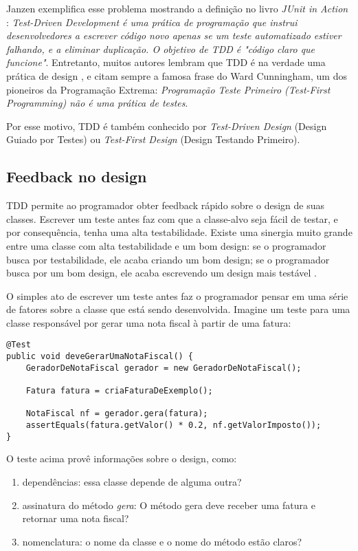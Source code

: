 Janzen \cite{tdd-taxonomy} exemplifica esse problema mostrando a definição no livro \textit{JUnit in Action} \cite{junit-in-action}:
\textit{Test-Driven Development é uma prática de programação que instrui desenvolvedores a escrever código novo apenas se um teste
automatizado estiver falhando, e a eliminar duplicação. O objetivo de TDD é "código claro que funcione"}. 
Entretanto, muitos autores lembram que TDD é na verdade uma prática de design \cite{tdd-taxonomy} \cite{aim-fire}, 
e citam sempre a famosa frase do Ward Cunningham, um dos pioneiros da Programação Extrema:
\textit{Programação Teste Primeiro (Test-First Programming) não é uma prática de testes}. 

Por esse motivo, TDD é também conhecido por \textit{Test-Driven Design} (Design Guiado por Testes) ou \textit{Test-First Design}
(Design Testando Primeiro).

\subsection{Feedback no design}

TDD permite ao programador obter feedback rápido sobre o design de suas classes. Escrever um teste antes faz com que
a classe-alvo seja fácil de testar, e por consequência, tenha uma alta testabilidade. Existe uma sinergia muito
grande entre uma classe com alta testabilidade e um bom design: se o programador busca por testabilidade,
ele acaba criando um bom design; se o programador busca por um bom design, ele acaba escrevendo um design mais testável \cite{feathers-synergy}.  

O simples ato de escrever um teste antes faz o programador pensar em uma série de fatores 
sobre a classe que está sendo desenvolvida. Imagine um teste para uma 
classe responsável por gerar uma nota fiscal à partir de uma fatura:

\begin{lstlisting}[frame=trbl]
@Test
public void deveGerarUmaNotaFiscal() {
	GeradorDeNotaFiscal gerador = new GeradorDeNotaFiscal();
	
	Fatura fatura = criaFaturaDeExemplo();
	
	NotaFiscal nf = gerador.gera(fatura);
	assertEquals(fatura.getValor() * 0.2, nf.getValorImposto());
}
\end{lstlisting}

O teste acima provê informações sobre o design, como:

\begin{enumerate}
	\item dependências: essa classe depende de alguma outra?
	\item assinatura do método \textit{gera}: O método gera deve receber uma fatura e retornar uma nota fiscal?
	\item nomenclatura: o nome da classe e o nome do método estão claros?
\end{enumerate}

